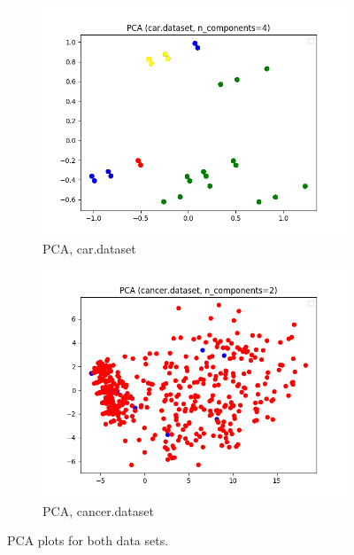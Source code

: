 \documentclass{article}
\begin{document}
      \begin{figure}[htb]
      \centering

        \begin{subfigure}{0.4\textwidth}
          \includegraphics[width=\linewidth]{out/pca/car-pca-comp-4.png}
          \caption{PCA, car.dataset}
          \label{fig:pca-plot-car}
        \end{subfigure}\hfil
        \begin{subfigure}{0.4\textwidth}
          \includegraphics[width=\linewidth]{out/pca/cancer-pca-comp-2.png}
          \caption{PCA, cancer.dataset}
          \label{fig:pca-plot-cancer}
        \end{subfigure}

      \caption{PCA plots for both data sets.}
      \label{fig:pca-plot}
      \end{figure}
\end{document}
